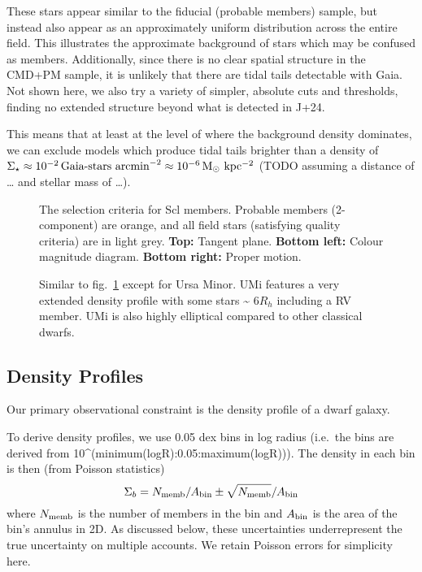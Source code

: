 These stars appear similar to the fiducial (probable members) sample,
but instead also appear as an approximately uniform distribution across
the entire field. This illustrates the approximate background of stars
which may be confused as members. Additionally, since there is no clear
spatial structure in the CMD+PM sample, it is unlikely that there are
tidal tails detectable with Gaia. Not shown here, we also try a variety
of simpler, absolute cuts and thresholds, finding no extended structure
beyond what is detected in J+24.

This means that at least at the level of where the background density
dominates, we can exclude models which produce tidal tails brighter than
a density of
\(\Sigma_\star \approx 10^{-2}\,\text{Gaia-stars\ arcmin}^{-2} \approx 10^{-6} \, {\rm M_\odot\ kpc^{-2}}\)
(TODO assuming a distance of \ldots{} and stellar mass of \ldots).

\begin{figure}
\centering
{}
\caption[Sculptor selection criteria]{The selection criteria for Scl
members. Probable members (2-component) are orange, and all field stars
(satisfying quality criteria) are in light grey. \textbf{Top:} Tangent
plane. \textbf{Bottom left:} Colour magnitude diagram. \textbf{Bottom
right:} Proper motion.}\label{fig:sculptor_selection}
\end{figure}

\begin{figure}
\centering
{}
\caption[Ursa Minor Selection]{Similar to
fig.~\ref{fig:sculptor_selection} except for Ursa Minor. UMi features a
very extended density profile with some stars \textasciitilde{} 6\(R_h\)
including a RV member. UMi is also highly elliptical compared to other
classical dwarfs.}\label{fig:umi_selection}
\end{figure}

\subsection{Density Profiles}\label{density-profiles}

Our primary observational constraint is the density profile of a dwarf
galaxy.

To derive density profiles, we use 0.05 dex bins in log radius (i.e.~the
bins are derived from 10\^{}(minimum(logR):0.05:maximum(logR))). The
density in each bin is then (from Poisson statistics) \[
\Sigma_b = N_{\rm memb} / A_{\rm bin} \pm \sqrt{N_{\rm memb}} / A_{\rm bin}
\] where \(N_{\rm memb}\) is the number of members in the bin and
\(A_{\rm bin}\) is the area of the bin's annulus in 2D. As discussed
below, these uncertainties underrepresent the true uncertainty on
multiple accounts. We retain Poisson errors for simplicity here.

